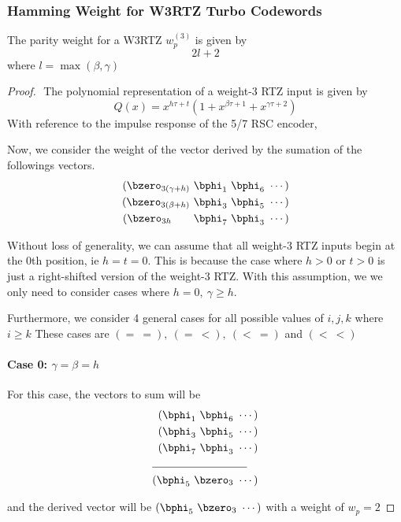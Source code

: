 \subsubsection{Hamming Weight for W3RTZ Turbo Codewords }
The parity weight for a W3RTZ  $w^{(3)}_{p}$ is given by
\begin{equation}
2l+2
\label{RTZInputs-2}
\end{equation}
where $l=\max(\beta,\gamma)$
\begin{proof}
$ $\newline
The polynomial representation of a weight-$3$ RTZ input is given by $$Q(x) =x^{h\tau+t}(1+x^{\beta \tau +1}+x^{\gamma \tau +2})$$
With reference to the impulse response of the 5/7  RSC encoder, 



Now, we consider the weight of the vector derived by the sumation of the followings vectors.
\begin{eqnarray*}
(\bzero_{3(\gamma+h)}~\bphi_1~\bphi_6~\cdots)\cr
(\bzero_{3(\beta+h)}~\bphi_3~\bphi_5~\cdots)\cr
(\bzero_{3 h}~~~~~~\bphi_7~\bphi_3~\cdots)
\end{eqnarray*}

Without loss of generality, we can assume that all weight-$3$ RTZ inputs begin at the $0$th position, ie $h=t=0$. This is because the case where $h>0$ or $t>0$ is just a right-shifted version of the weight-$3$ RTZ. With this assumption, we we only need to consider cases where $h= 0,~\gamma \geq h$.

Furthermore, we consider 4 general cases for all possible values of $i,j,k$ where $i \geq k$ These cases are $(=~=),~(=~<),~(<~=)$ and $(<~<)$
\paragraph{Case 0: $\gamma=\beta=h$ \newline}

 For this case, the vectors to sum will be 
 \begin{align*}
(\bphi_1~\bphi_6~\cdots)\\
(\bphi_3~\bphi_5~\cdots)\\
(\bphi_7~\bphi_3~\cdots)\\
\cline{1-2}
(\bphi_5~\bzero_{3}~\cdots)
\end{align*}
 
and  the derived vector will be $(\bphi_5~\bzero_{3}~\cdots)$ with a weight of $w_p=2$
 
 

\end{proof}
